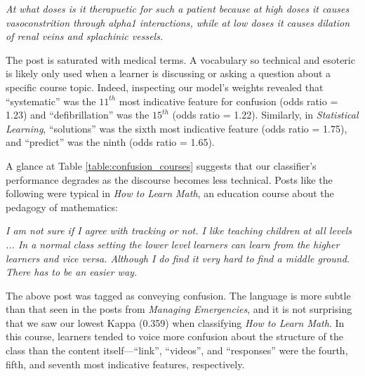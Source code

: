 \documentclass{edm_template}
\begin{document}
\vspace{-10pt}
\begin{displayquote}
\emph{At what doses is it therapuetic for such a patient because at high doses it causes vasoconstrition through alpha1 interactions, while at low doses it causes dilation of renal veins and splachinic vessels.}
\end{displayquote}
\vspace{-10pt}

The post is saturated with medical terms. A vocabulary so technical and esoteric is likely only used when a learner is discussing or asking a question about a specific course topic. Indeed, inspecting our model's weights revealed that ``systematic'' was the $11^{th}$ most indicative feature for confusion (odds ratio = 1.23) and ``defibrillation'' was the $15^{th}$ (odds ratio = 1.22). Similarly, in \emph{Statistical Learning}, ``solutions'' was the sixth most indicative feature (odds ratio = 1.75), and ``predict'' was the ninth (odds ratio = 1.65).

A glance at Table \ref{table:confusion_courses} suggests that our classifier's performance degrades as the discourse becomes less technical. Posts like the following were typical in \emph{How to Learn Math}, an education course about the pedagogy of mathematics:

\vspace{-10pt}
\begin{displayquote}
\emph{I am not sure if I agree with tracking or not.  I like teaching children at all levels ...  In a normal class setting the lower level learners can learn from the higher learners and vice versa.  Although I do find it very hard to find a middle ground. There has to be an easier way.}
\vspace{-10pt}
\end{displayquote}

The above post was tagged as conveying confusion. The language is more subtle than that seen in the posts from \emph{Managing Emergencies}, and it is not surprising that we saw our lowest Kappa (0.359) when classifying \emph{How to Learn Math}. In this course, learners tended to voice more confusion about the structure of the class than the content itself---``link'', ``videos'', and ``responses'' were the fourth, fifth, and seventh most indicative features, respectively.
\end{document}
